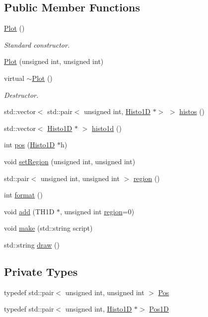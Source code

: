 \subsection*{Public Member Functions}
\begin{DoxyCompactItemize}
\item 
\hyperlink{classPlot_ae8dca35f270d0964aac1e4ff42259129}{Plot} ()
\begin{DoxyCompactList}\small\item\em Standard constructor. \end{DoxyCompactList}\item 
\hyperlink{classPlot_a4e89bc6ea1800ba9697c9e0a0dc50a2e}{Plot} (unsigned int, unsigned int)
\item 
virtual \hyperlink{classPlot_a277e9c79c4357b3a317d74d61dabefcf}{$\sim$\+Plot} ()
\begin{DoxyCompactList}\small\item\em Destructor. \end{DoxyCompactList}\item 
std\+::vector$<$ std\+::pair$<$ unsigned int, \hyperlink{classHisto1D}{Histo1D} $\ast$$>$ $>$ \hyperlink{classPlot_af72e70c6b53df941708cd8d971083227}{histos} ()
\item 
std\+::vector$<$ \hyperlink{classHisto1D}{Histo1D} $\ast$ $>$ \hyperlink{classPlot_ad6f34fe5ab1a94b411b4fc121e0641bc}{histo1d} ()
\item 
int \hyperlink{classPlot_a3f7d4915b045844af0773d09d0c185ad}{pos} (\hyperlink{classHisto1D}{Histo1D} $\ast$h)
\item 
void \hyperlink{classPlot_a77a015d72e98d6fb066481e9c70af1ec}{set\+Region} (unsigned int, unsigned int)
\item 
std\+::pair$<$ unsigned int, unsigned int $>$ \hyperlink{classPlot_ae493b21749049d75cbb7282b1e1b9ab4}{region} ()
\item 
int \hyperlink{classPlot_a4a7404547e8a9d5dd0a921bfff3ed406}{format} ()
\item 
void \hyperlink{classPlot_ac0e03af81b0591d4786ff03441524eb2}{add} (T\+H1D $\ast$, unsigned int \hyperlink{classPlot_ae493b21749049d75cbb7282b1e1b9ab4}{region}=0)
\item 
void \hyperlink{classPlot_abe449e7c57a55f3bf0ee9201d07d497d}{make} (std\+::string script)
\item 
std\+::string \hyperlink{classPlot_aa49856f69c852f7f0ba65ed6131b7b61}{draw} ()
\end{DoxyCompactItemize}
\subsection*{Private Types}
\begin{DoxyCompactItemize}
\item 
typedef std\+::pair$<$ unsigned int, unsigned int $>$ \hyperlink{classPlot_a07543869c4a57b91ea0ec9835cb165ca}{Pos}
\item 
typedef std\+::pair$<$ unsigned int, \hyperlink{classHisto1D}{Histo1D} $\ast$$>$ \hyperlink{classPlot_ac411abcbcce315d4e77094393e6ca418}{Pos1D}
\end{DoxyCompactItemize}
